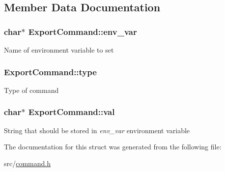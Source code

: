 \subsection{Member Data Documentation}
\hypertarget{structExportCommand_a8343f52c0f5198ccb21ed3f0c13d5842}{
\subsubsection[{env\-\_\-var}]{\setlength{\rightskip}{0pt plus 5cm}char$\ast$ Export\-Command\-::env\-\_\-var}}\label{structExportCommand_a8343f52c0f5198ccb21ed3f0c13d5842}
Name of environment variable to set \hypertarget{structExportCommand_a6089a285f9584b6f1c5430b46a9c0758}{
\subsubsection[{type}]{ Export\-Command\-::type}}\label{structExportCommand_a6089a285f9584b6f1c5430b46a9c0758}
Type of command \hypertarget{structExportCommand_a8e75db85606e5f9cfcc149c116c3be51}{
\subsubsection[{val}]{\setlength{\rightskip}{0pt plus 5cm}char$\ast$ Export\-Command\-::val}}\label{structExportCommand_a8e75db85606e5f9cfcc149c116c3be51}
String that should be stored in {\itshape env\-\_\-var} environment variable 

The documentation for this struct was generated from the following file\-:\begin{DoxyCompactItemize}
\item 
src/\hyperlink{command_8h}{command.\-h}\end{DoxyCompactItemize}
